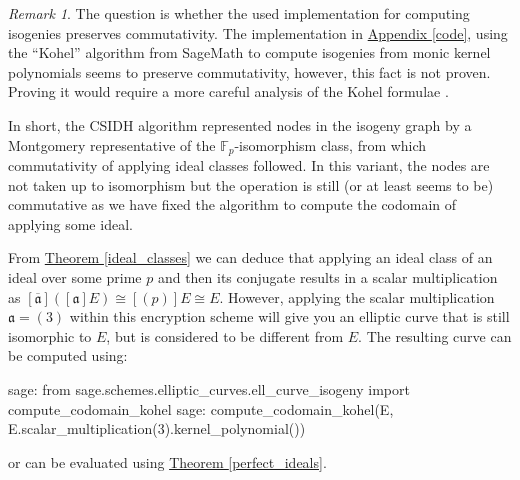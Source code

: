 \documentclass[openany, a4paper, 10pt]{book}
\theoremstyle{plain}
\theoremstyle{plain}
\theoremstyle{plain}
\theoremstyle{definition}
\theoremstyle{plain}
\theoremstyle{definition}
\theoremstyle{remark}
\newtheorem*{remark}{Remark}
\newcommand{\theoref}[1]{\hyperref[#1]{Theorem \ref{#1}}}
\newcommand{\apref}[1]{\hyperref[#1]{Appendix \ref{#1}}}
\begin{document}
\begin{remark}
    The question is whether the used implementation for computing isogenies preserves commutativity.
    The implementation in \apref{code}, using the ``Kohel'' algorithm from SageMath to compute isogenies from monic kernel polynomials seems to preserve commutativity, however, this fact is not proven.
    Proving it would require a more careful analysis of the Kohel formulae \cite[Section~2.4]{Kohel}.
\end{remark}
In short, the CSIDH algorithm represented nodes in the isogeny graph by a Montgomery representative of the $\mathbb F_p$-isomorphism class, from which commutativity of applying ideal classes followed.
In this variant, the nodes are not taken up to isomorphism but the operation is still (or at least seems to be) commutative as we have fixed the algorithm to compute the codomain of applying some ideal.

From \theoref{ideal_classes} we can deduce that applying an ideal class of an ideal over some prime $p$ and then its conjugate results in a scalar multiplication as $[\overline{\mathfrak a}]([\mathfrak a]E) \cong [(p)]E \cong E$.
However, applying the scalar multiplication $\mathfrak a=(3)$ within this encryption scheme will give you an elliptic curve that is still isomorphic to $E$, but is considered to be different from $E$.
The resulting curve can be computed using:
\begin{python}
sage: from sage.schemes.elliptic_curves.ell_curve_isogeny import compute_codomain_kohel
sage: compute_codomain_kohel(E, E.scalar_multiplication(3).kernel_polynomial())
\end{python}
or can be evaluated using \theoref{perfect_ideals}.
\end{document}
